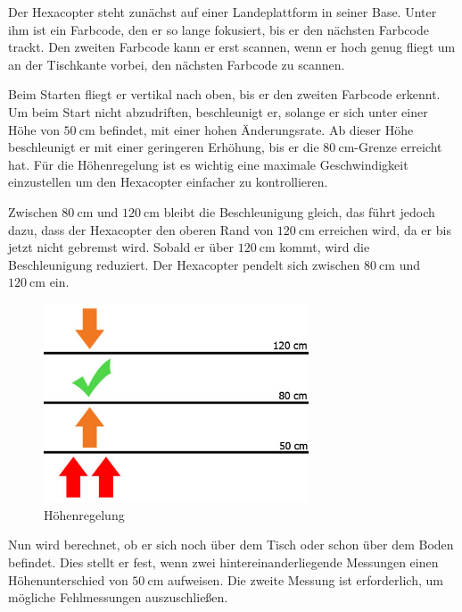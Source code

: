     Der Hexacopter steht zunächst auf einer Landeplattform in seiner Base. Unter ihm ist ein Farbcode, den er so lange fokusiert, bis er den nächsten Farbcode trackt. Den zweiten Farbcode kann er erst scannen, wenn er hoch genug fliegt um an der Tischkante vorbei, den nächsten Farbcode zu scannen.

    Beim Starten fliegt er vertikal nach oben, bis er den zweiten Farbcode erkennt. Um beim Start nicht abzudriften, beschleunigt er, solange er sich unter einer Höhe von $\SI{50}{\centi\metre}$ befindet, mit einer hohen Änderungsrate. Ab dieser Höhe beschleunigt er mit einer geringeren Erhöhung, bis er die $\SI{80}{\centi\metre}$-Grenze erreicht hat. Für die Höhenregelung ist es wichtig eine maximale Geschwindigkeit einzustellen um den Hexacopter einfacher zu kontrollieren. 
    
    Zwischen $\SI{80}{\centi\metre}$ und $\SI{120}{\centi\metre}$ bleibt die Beschleunigung gleich, das führt jedoch dazu, dass der Hexacopter den oberen Rand von $\SI{120}{\centi\metre}$ erreichen wird, da er bis jetzt nicht gebremst wird. Sobald er über $\SI{120}{\centi\metre}$ kommt, wird die Beschleunigung reduziert. Der Hexacopter pendelt sich zwischen $\SI{80}{\centi\metre}$ und $\SI{120}{\centi\metre}$ ein.

    \begin{figure}[tbh]
      \begin{centering}
        \includegraphics[width = 0.7\textwidth]{Bilder/bor_hoehenregelung}
      \par\end{centering}
      \caption{Höhenregelung}
      \label{Throttle}
    \end{figure}

    Nun wird berechnet, ob er sich noch über dem Tisch oder schon über dem Boden befindet. Dies stellt er fest, wenn zwei hintereinanderliegende Messungen einen Höhenunterschied von $\SI{50}{\centi\metre}$ aufweisen. Die zweite Messung ist erforderlich, um mögliche Fehlmessungen auszuschließen.


